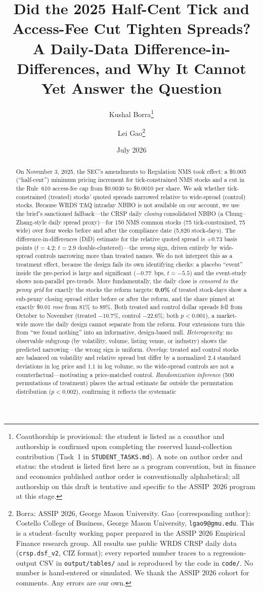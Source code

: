 \documentclass[12pt]{article}
\title{\textbf{Did the 2025 Half-Cent Tick and Access-Fee Cut Tighten Spreads?\\
A Daily-Data Difference-in-Differences, and Why It Cannot Yet Answer the Question}}
\author{Kushal Borra\thanks{Coauthorship is provisional: the student is listed as a coauthor and authorship is confirmed upon completing the reserved hand-collection contribution (Task~1 in \texttt{STUDENT\_TASKS.md}). A note on author order and status: the student is listed first here as a program convention, but in finance and economics published author order is conventionally alphabetical; all authorship on this draft is tentative and specific to the ASSIP~2026 program at this stage.} \and Lei Gao\thanks{Borra: ASSIP 2026, George Mason University.
Gao (corresponding author): Costello College of Business, George Mason University,
\texttt{lgao9@gmu.edu}. This is a student--faculty working paper prepared in the ASSIP 2026
Empirical Finance research group. All results use public WRDS CRSP daily data
(\texttt{crsp.dsf\_v2}, CIZ format); every reported number traces to a regression-output CSV
in \texttt{output/tables/} and is reproduced by the code in \texttt{code/}. No number is
hand-entered or simulated. We thank the ASSIP 2026 cohort for comments. Any errors are our own.}}
\date{July 2026}
\begin{document}
\maketitle

\begin{abstract}
\noindent On November 3, 2025, the SEC's amendments to Regulation NMS took effect: a
\$0.005 (``half-cent'') minimum pricing increment for tick-constrained NMS stocks and a
cut in the Rule~610 access-fee cap from \$0.0030 to \$0.0010 per share. We ask whether
tick-constrained (treated) stocks' quoted spreads narrowed relative to wide-spread
(control) stocks. Because WRDS TAQ intraday NBBO is not available on our account, we use
the brief's sanctioned fallback---the CRSP daily \emph{closing} consolidated NBBO
(a Chung--Zhang-style daily spread proxy)---for 150 NMS common stocks (75 tick-constrained,
75 wide) over four weeks before and after the compliance date (5{,}820 stock-days). The
difference-in-differences (DiD) estimate for the relative quoted spread is $+0.73$ basis
points ($t=4.2$; $t=2.9$ double-clustered)---the \emph{wrong} sign, driven entirely by
wide-spread controls narrowing more than treated names. We do not interpret this as a
treatment effect, because the design fails its own identifying checks: a placebo
``event'' inside the pre-period is large and significant ($-0.77$~bps, $t=-5.5$) and the
event-study shows non-parallel pre-trends. More fundamentally, the daily close is
\emph{censored to the penny grid} for exactly the stocks the reform targets:
\textbf{0.0\%} of treated stock-days show a sub-penny closing spread either before or
after the reform, and the share pinned at exactly \$0.01 \emph{rose} from 81\% to 89\%.
Both treated and control dollar spreads fell from October to November (treated $-10.7\%$,
control $-22.6\%$; both $p<0.001$), a market-wide move the daily design cannot separate
from the reform. Four extensions turn this from ``we found nothing'' into an informative,
design-based null. \emph{Heterogeneity:} no observable subgroup (by volatility, volume,
listing venue, or industry) shows the predicted narrowing---the wrong sign is uniform.
\emph{Overlap:} treated and control stocks are balanced on volatility and relative spread
but differ by a normalized $2.4$ standard deviations in log price and $1.1$ in log volume,
so the wide-spread controls are not a counterfactual---motivating a price-matched control.
\emph{Randomization inference} (500 permutations of treatment) places the actual estimate
far outside the permutation distribution ($p<0.002$), confirming it reflects the systematic

\end{abstract}
\end{document}
